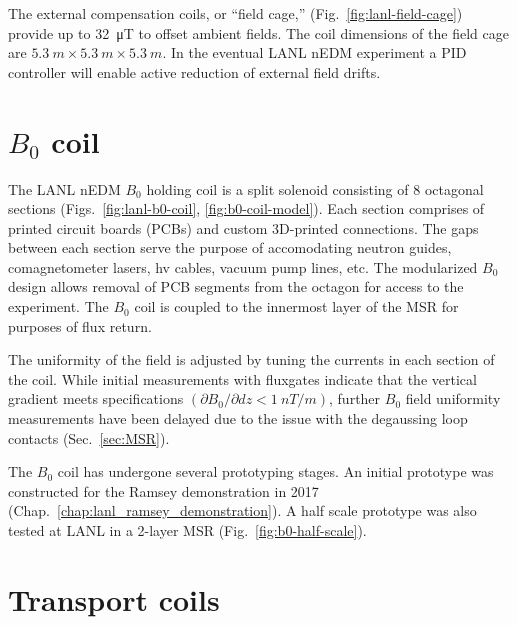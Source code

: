 The external compensation coils, or ``field cage,'' (Fig.~\ref{fig:lanl-field-cage}) provide up to \qty{32}{\micro\tesla} to offset ambient fields. The coil dimensions of the field cage are $\qty{5.3}{m}\times\qty{5.3}{m}\times\qty{5.3}{m}$. In the eventual LANL nEDM experiment a PID controller will enable active reduction of external field drifts.


\section{
    \texorpdfstring{$B_0$ coil}
                {B0 coil}\label{sec:B0_coil}
}


The LANL nEDM $B_0$ holding coil is a split solenoid consisting of 8 octagonal sections (Figs.~\ref{fig:lanl-b0-coil}, \ref{fig:b0-coil-model}). Each section comprises of printed circuit boards (PCBs) and custom 3D-printed connections. The gaps between each section serve the purpose of accomodating neutron guides, comagnetometer lasers, \acrshort*{hv} cables, vacuum pump lines, etc. The modularized $B_0$ design allows removal of PCB segments from the octagon for access to the experiment. The $B_0$ coil is coupled to the innermost layer of the MSR for purposes of flux return. 

The uniformity of the field is adjusted by tuning the currents in each section of the coil. While initial measurements with fluxgates indicate that the vertical gradient meets specifications $(\partial B_0/\partial dz < \qty{1}{nT \per m})$, further $B_0$ field uniformity measurements have been delayed due to the issue with the degaussing loop contacts (Sec.~\ref{sec:MSR}).

The $B_0$ coil has undergone several prototyping stages. An initial prototype was constructed for the Ramsey demonstration in 2017 (Chap.~\ref{chap:lanl_ramsey_demonstration}). A half scale prototype was also tested at LANL in a 2-layer MSR (Fig.~\ref{fig:b0-half-scale}).


\section{Transport coils}\label{sec:transport_coils}


